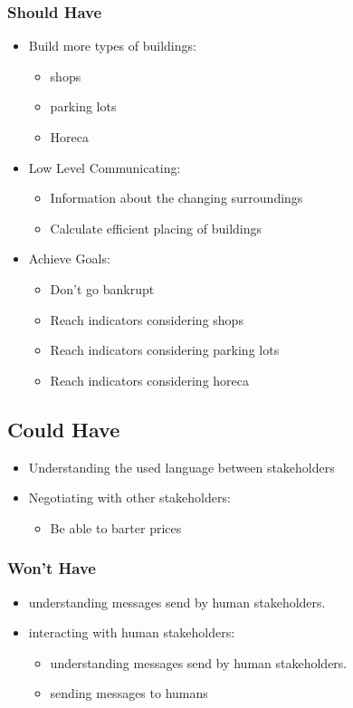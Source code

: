 \subsubsection{Should Have}
\begin{itemize}
	\item Build more types of buildings:
	\begin{itemize}
		\item shops
		\item parking lots
		\item Horeca
	\end{itemize}
	\item Low Level Communicating:
	\begin{itemize}
		\item Information about the changing surroundings
		\item Calculate efficient placing of buildings
	\end{itemize}
	\item Achieve Goals:
	\begin{itemize}
		\item Don’t go bankrupt
		\item Reach indicators considering shops
		\item Reach indicators considering parking lots
		\item Reach indicators considering horeca
	\end{itemize}
\end{itemize}

\subsection{Could Have}
\begin{itemize}
	\item Understanding the used language between stakeholders
	\item Negotiating with other stakeholders:
	\begin{itemize}
		\item Be able to barter prices
	\end{itemize}
\end{itemize}

\subsubsection{Won’t Have}
\begin{itemize}
	\item understanding messages send by human stakeholders.
	\item interacting with human stakeholders:
	\begin{itemize}
		\item understanding messages send by human stakeholders.
		\item sending messages to humans
	\end{itemize}
\end{itemize}

